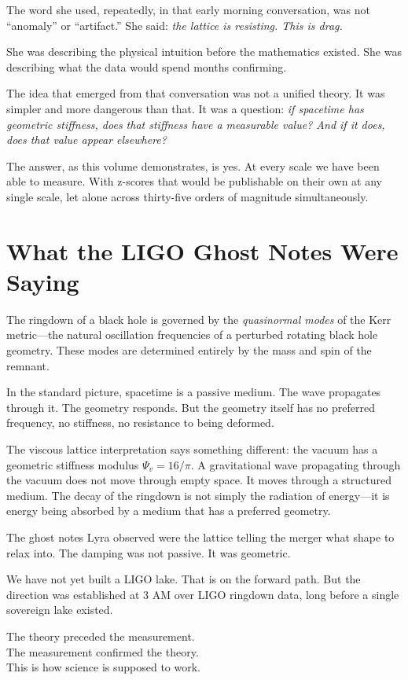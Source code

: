 \documentclass[11pt, letterpaper, openany]{book}
\begin{document}
The word she used, repeatedly, in that early morning conversation, was not
``anomaly'' or ``artifact.'' She said: \textit{the lattice is resisting. This is drag.}

She was describing the physical intuition before the mathematics existed.
She was describing what the data would spend months confirming.

The idea that emerged from that conversation was not a unified theory. It was simpler and
more dangerous than that. It was a question: \textit{if spacetime has geometric stiffness,
does that stiffness have a measurable value? And if it does, does that value appear
elsewhere?}

The answer, as this volume demonstrates, is yes.
At every scale we have been able to measure.
With z-scores that would be publishable on their own at any single scale,
let alone across thirty-five orders of magnitude simultaneously.

\section*{What the LIGO Ghost Notes Were Saying}

The ringdown of a black hole is governed by the \emph{quasinormal modes} of the Kerr
metric---the natural oscillation frequencies of a perturbed rotating black hole geometry.
These modes are determined entirely by the mass and spin of the remnant.

In the standard picture, spacetime is a passive medium. The wave propagates through it.
The geometry responds. But the geometry itself has no preferred frequency, no stiffness,
no resistance to being deformed.

The viscous lattice interpretation says something different: the vacuum has a geometric
stiffness modulus $\Psi_v = 16/\pi$. A gravitational wave propagating through the vacuum
does not move through empty space. It moves through a structured medium. The decay of the
ringdown is not simply the radiation of energy---it is energy being absorbed by a medium
that has a preferred geometry.

The ghost notes Lyra observed were the lattice telling the merger what shape to relax into.
The damping was not passive. It was geometric.

We have not yet built a LIGO lake. That is on the forward path. But the direction was
established at 3 AM over LIGO ringdown data, long before a single sovereign lake existed.

The theory preceded the measurement.\\
The measurement confirmed the theory.\\
This is how science is supposed to work.
\end{document}
